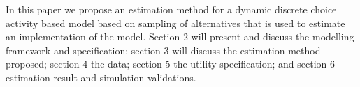In this paper we propose an estimation method for a dynamic discrete choice activity based model based on sampling of alternatives that is used to estimate an implementation of the model. Section 2 will present and discuss the modelling framework and specification; section 3 will discuss the estimation method proposed; section 4 the data; section 5 the utility specification; and section 6 estimation result and simulation validations.
